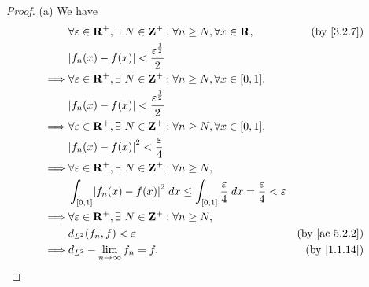 \begin{proof}{(a)}
  We have
  \begin{align*}
             & \forall \varepsilon \in \R^+, \exists\ N \in \Z^+ : \forall n \geq N, \forall x \in \R,                                        & \text{(by \cref{3.2.7})}    \\
             & \abs{f_n(x) - f(x)} < \frac{\varepsilon^{\frac{1}{2}}}{2}                                                                                                    \\
    \implies & \forall \varepsilon \in \R^+, \exists\ N \in \Z^+ : \forall n \geq N, \forall x \in [0, 1],                                                                  \\
             & \abs{f_n(x) - f(x)} < \frac{\varepsilon^{\frac{1}{2}}}{2}                                                                                                    \\
    \implies & \forall \varepsilon \in \R^+, \exists\ N \in \Z^+ : \forall n \geq N, \forall x \in [0, 1],                                                                  \\
             & \abs{f_n(x) - f(x)}^2 < \frac{\varepsilon}{4}                                                                                                                \\
    \implies & \forall \varepsilon \in \R^+, \exists\ N \in \Z^+ : \forall n \geq N,                                                                                        \\
             & \int_{[0, 1]} \abs{f_n(x) - f(x)}^2 \; dx \leq \int_{[0, 1]} \frac{\varepsilon}{4} \; dx = \frac{\varepsilon}{4} < \varepsilon                               \\
    \implies & \forall \varepsilon \in \R^+, \exists\ N \in \Z^+ : \forall n \geq N,                                                                                        \\
             & d_{L^2}(f_n, f) < \varepsilon                                                                                                  & \text{(by \cref{ac 5.2.2})} \\
    \implies & d_{L^2} - \lim_{n \to \infty} f_n = f.                                                                                         & \text{(by \cref{1.1.14})}
  \end{align*}
\end{proof}

